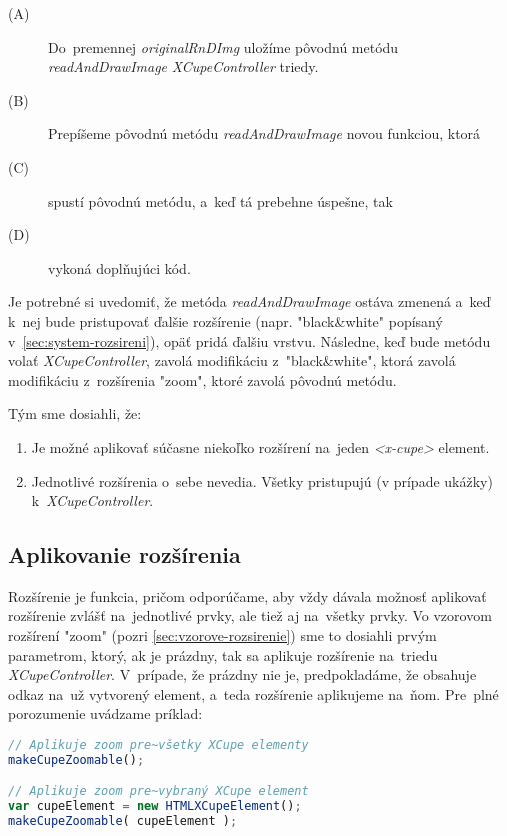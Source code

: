 \begin{description}
	\item [(A)] Do~premennej \emph{originalRnDImg} uložíme pôvodnú metódu \emph{readAndDrawImage} \emph{XCupeController} triedy. 
	\item [(B)] Prepíšeme pôvodnú metódu \emph{readAndDrawImage} novou funkciou, ktorá
	\item [(C)] spustí pôvodnú metódu, a~keď tá prebehne úspešne, tak
	\item [(D)] vykoná doplňujúci kód.
\end{description}

Je potrebné si uvedomiť, že metóda \emph{readAndDrawImage} ostáva zmenená a~keď k~nej bude pristupovať ďalšie rozšírenie (napr. "black\&white" popísaný v~\ref{sec:system-rozsireni}), opäť pridá ďalšiu vrstvu. Následne, keď bude metódu volať \emph{XCupeController}, zavolá modifikáciu z~"black\&white", ktorá zavolá modifikáciu z~rozšírenia "zoom", ktoré zavolá pôvodnú metódu.


Tým sme dosiahli, že:

\begin{enumerate}
	\item Je možné aplikovať súčasne niekoľko rozšírení na~jeden \emph{<x-cupe>} element.
	\item Jednotlivé rozšírenia o~sebe nevedia. Všetky pristupujú (v prípade ukážky) k~\emph{XCupeController}. 
\end{enumerate}


\subsection{Aplikovanie rozšírenia}

Rozšírenie je funkcia, pričom odporúčame, aby vždy dávala možnosť aplikovať rozšírenie zvlášť na~jednotlivé prvky, ale tiež aj na~všetky prvky. Vo vzorovom rozšírení "zoom" (pozri \ref{sec:vzorove-rozsirenie}) sme to dosiahli prvým parametrom, ktorý, ak je prázdny, tak sa aplikuje rozšírenie na~triedu \emph{XCupeController}. V~prípade, že prázdny nie je, predpokladáme, že obsahuje odkaz na~už vytvorený element, a~teda rozšírenie aplikujeme na~ňom. Pre~plné porozumenie uvádzame príklad:

\begin{lstlisting}[language=JavaScript]
// Aplikuje zoom pre~všetky XCupe elementy
makeCupeZoomable();

// Aplikuje zoom pre~vybraný XCupe element
var cupeElement = new HTMLXCupeElement();
makeCupeZoomable( cupeElement );
\end{lstlisting}


